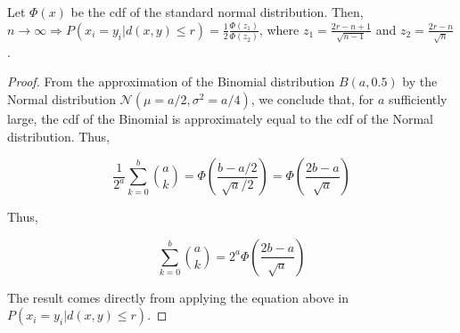 \begin{lemma}
Let $\Phi(x)$ be the cdf of the standard normal distribution. Then, $n \rightarrow \infty \Rightarrow P(x_i = y_i | d(x, y) \le r) = \frac{1}{2} \frac{\Phi(z_1)}{\Phi(z_2)}$, where $z_1 = \frac{2r - n + 1}{\sqrt{n-1}}$ and $z_2 = \frac{2r - n}{\sqrt{n}}$.
\label{thm:sdm-T1-n-large}
\end{lemma}
\begin{proof}

From the approximation of the Binomial distribution $B(a, 0.5)$ by the Normal distribution $\mathcal{N}(\mu = a/2, \sigma^2 = a/4)$, we conclude that, for $a$ sufficiently large, the cdf of the Binomial is approximately equal to the cdf of the Normal distribution. Thus,

$$
\frac{1}{2^a} \sum_{k=0}^{b} \binom{a}{k} = \Phi \left( \frac{b-a/2}{\sqrt{a}/2} \right) = \Phi \left( \frac{2b-a}{\sqrt{a}} \right)
$$

Thus,

$$
\sum_{k=0}^{b} \binom{a}{k} = 2^a \Phi \left( \frac{2b-a}{\sqrt{a}} \right)
$$

The result comes directly from applying the equation above in $P(x_i = y_i | d(x, y) \le r)$.

\end{proof}

